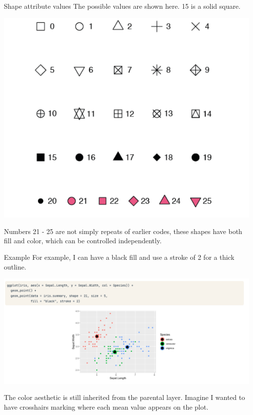 \documentclass[
  ignorenonframetext,
]{beamer}
\begin{document}
\begin{frame}{Shape attribute values}
\label{shape-attribute-values}
The possible values are shown here. 15 is a solid square.

\includegraphics{../images/im191.png}

Numbers 21 - 25 are not simply repeats of earlier codes, these shapes
have both fill and color, which can be controlled independently.
\end{frame}

\begin{frame}{Example}
\label{example}
For example, I can have a black fill and use a stroke of 2 for a thick
outline.

\includegraphics{../images/im192.png}

The color aesthetic is still inherited from the parental layer. Imagine
I wanted to have crosshairs marking where each mean value appears on the
plot.
\end{frame}
\end{document}
